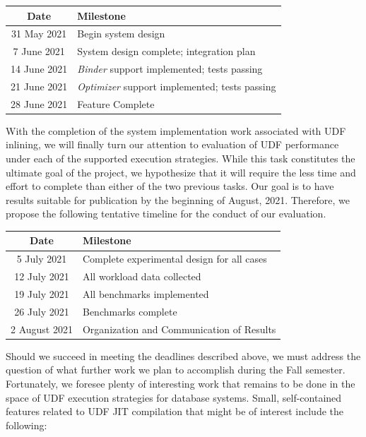\documentclass{vldb}
\begin{document}
\begin{center}
\begin{tabular}{ |c|l| } 
    \hline
    \textbf{Date} & \textbf{Milestone} \\ 
    \hline
    31 May 2021 & Begin system design \\
    \hline
    7 June 2021 & System design complete; integration plan \\
    \hline
    14 June 2021 & \textit{Binder} support implemented; tests passing \\
    \hline
    21 June 2021 & \textit{Optimizer} support implemented; tests passing \\
    \hline  
    28 June 2021 & Feature Complete \\
    \hline
\end{tabular}
\end{center}

With the completion of the system implementation work associated with UDF inlining, we will finally turn our attention to evaluation of UDF performance under each of the supported execution strategies. While this task constitutes the ultimate goal of the project, we hypothesize that it will require the less time and effort to complete than either of the two previous tasks. Our goal is to have results suitable for publication by the beginning of August, 2021. Therefore, we propose the following tentative timeline for the conduct of our evaluation.

\begin{center}
\begin{tabular}{ |c|l| } 
    \hline
    \textbf{Date} & \textbf{Milestone} \\ 
    \hline
    5 July 2021 & Complete experimental design for all cases \\
    \hline
    12 July 2021 &  All workload data collected \\
    \hline
    19 July 2021 & All benchmarks implemented \\
    \hline
    26 July 2021 & Benchmarks complete \\
    \hline
    2 August 2021 & Organization and Communication of Results \\
    \hline
\end{tabular}
\end{center}

Should we succeed in meeting the deadlines described above, we must address the question of what further work we plan to accomplish during the Fall semester. Fortunately, we foresee plenty of interesting work that remains to be done in the space of UDF execution strategies for database systems. Small, self-contained features related to UDF JIT compilation that might be of interest include the following:
\end{document}
